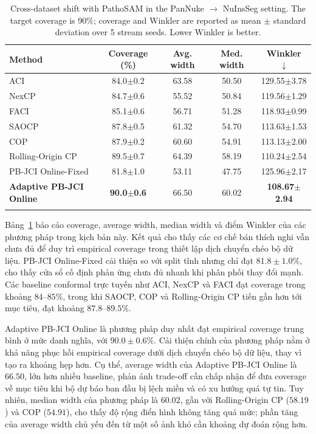 \documentclass[pdflatex,sn-mathphys-num]{sn-jnl}
\begin{document}
\begin{table}[!ht]
\caption{Cross-dataset shift with PathoSAM in the PanNuke $\to$ NuInsSeg setting.
The target coverage is $90\%$; coverage and Winkler are reported as mean $\pm$ standard
deviation over 5 stream seeds. Lower Winkler is better.}
\label{tab:cross}
\centering
\begin{tabular}{@{}lcccc@{}}
\toprule
Method & Coverage (\%) & Avg. width & Med. width & Winkler $\downarrow$ \\
\midrule
ACI
& 84.0$\pm$0.2 & 63.58 & 50.50 & 129.55$\pm$3.78 \\
NexCP
& 84.7$\pm$0.6 & 55.52 & 50.84 & 119.56$\pm$1.29 \\
FACI
& 85.1$\pm$0.6 & 56.71 & 51.28 & 118.93$\pm$0.99 \\
SAOCP
& 87.8$\pm$0.5 & 61.32 & 54.70 & 113.63$\pm$1.53 \\
COP
& 87.9$\pm$0.2 & 60.60 & 54.91 & 113.13$\pm$2.00 \\
Rolling-Origin CP
& 89.5$\pm$0.7 & 64.39 & 58.19 & 110.24$\pm$2.54 \\
PB-JCI Online-Fixed
& 81.8$\pm$1.0 & 53.11 & 47.75 & 125.96$\pm$2.17 \\
\textbf{Adaptive PB-JCI Online}
& \textbf{90.0$\pm$0.6} & 66.50 & 60.02 & \textbf{108.67$\pm$2.94} \\
\botrule
\end{tabular}
\end{table}

Bảng~\ref{tab:cross} báo cáo coverage, average width, median width và điểm Winkler của
các phương pháp trong kịch bản này. Kết quả cho thấy các cơ chế bán thích nghi vẫn chưa
đủ để duy trì empirical coverage trong thiết lập dịch chuyển chéo bộ dữ liệu. PB-JCI
Online-Fixed cải thiện so với split tĩnh nhưng
chỉ đạt $81.8\pm1.0\%$, cho thấy cửa sổ cố định phản ứng chưa đủ nhanh khi phân phối
thay đổi mạnh. Các baseline conformal trực tuyến như ACI, NexCP và FACI đạt coverage
trong khoảng $84$--$85\%$, trong khi SAOCP, COP và Rolling-Origin CP tiến gần hơn
tới mục tiêu, đạt khoảng $87.8$--$89.5\%$.

Adaptive PB-JCI Online là phương pháp duy nhất đạt empirical coverage trung bình ở mức
danh nghĩa, với $90.0\pm0.6\%$. Cải thiện chính của phương pháp nằm ở khả năng phục hồi
empirical coverage dưới dịch chuyển chéo bộ dữ liệu, thay vì tạo ra khoảng hẹp hơn.
Cụ thể, average width của Adaptive PB-JCI Online là $66.50$, lớn hơn nhiều baseline,
phản ánh trade-off cần chấp nhận để đưa coverage về mục tiêu khi bộ dự báo ban đầu bị
lệch miền và có xu hướng quá tự tin. Tuy nhiên, median width của phương pháp là $60.02$,
gần với Rolling-Origin CP ($58.19$) và COP ($54.91$), cho thấy độ rộng điển hình
không tăng quá mức; phần tăng của average width chủ yếu đến từ một số ảnh khó cần
khoảng dự đoán rộng hơn.
\end{document}
